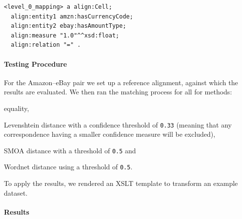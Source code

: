 \lstset{caption=Level 0 mapping element example, label=listing_correspondence}
\lstset{language=turtle}
\begin{lstlisting}
<level_0_mapping> a align:Cell;
  align:entity1 amzn:hasCurrencyCode;
  align:entity2 ebay:hasAmountType;
  align:measure "1.0"^^xsd:float;
  align:relation "=" .
\end{lstlisting}

% 

\paragraph{Testing Procedure}
For the Amazon--eBay pair we set up a reference alignment, against which the results are evaluated.
We then ran the matching process for all for methods:
\begin{inparaenum}[(1)]
    \item equality,
    \item Levenshtein distance with a confidence threshold of \texttt{0.33} (meaning that any correspondence having a smaller confidence measure will be excluded),
    \item SMOA distance with a threshold of \texttt{0.5} and
    \item Wordnet distance using a threshold of \texttt{0.5}.
\end{inparaenum}
To apply the results, we rendered an XSLT template to transform an example dataset.

\paragraph{Results}

